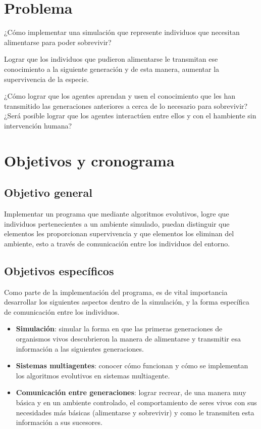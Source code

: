 \documentclass[times,10pt,twocolumn]{article}
\begin{document}
\section{Problema}
¿Cómo implementar una simulación que represente individuos que necesitan alimentarse para poder sobrevivir?\par
Lograr que los individuos que pudieron alimentarse le transmitan ese conocimiento a la siguiente generación y de esta manera, aumentar la supervivencia de la especie.\par
¿Cómo lograr que los agentes aprendan y usen el conocimiento que les han transmitido las generaciones anteriores a cerca de lo necesario para sobrevivir?
¿Será posible lograr que los agentes interactúen entre ellos y con el hambiente sin intervención humana?

\section{Objetivos y cronograma}

\subsection{Objetivo general}

Implementar un programa que mediante algoritmos evolutivos, logre que individuos pertenecientes a un ambiente simulado, puedan distinguir que elementos les proporcionan supervivencia y que elementos los eliminan del ambiente, esto a través de comunicación entre los individuos del entorno.

\subsection{Objetivos específicos}

Como parte de la implementación del programa, es de vital importancia desarrollar los siguientes aspectos dentro de la simulación, y la forma específica de comunicación entre los individuos.
\begin{itemize}
    \item \textbf{Simulación}: simular la forma en que las primeras generaciones de organismos vivos descubrieron la manera de alimentarse y transmitir esa información a las siguientes generaciones.
    \item \textbf{Sistemas multiagentes}: conocer cómo funcionan y cómo se implementan los algoritmos evolutivos en sistemas multiagente.
    \item \textbf{Comunicación entre generaciones}: lograr recrear, de una manera muy básica y en un ambiente controlado, el comportamiento de seres vivos con sus necesidades más básicas (alimentarse y sobrevivir) y como le transmiten esta información a sus sucesores.
\end{itemize}
\end{document}
